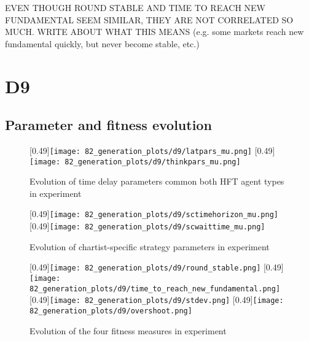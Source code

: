 EVEN THOUGH ROUND STABLE AND TIME TO REACH NEW FUNDAMENTAL SEEM SIMILAR, THEY ARE NOT CORRELATED SO MUCH. WRITE ABOUT WHAT THIS MEANS (e.g. some markets reach new fundamental quickly, but never become stable, etc.)

\section{D9}

\subsection{Parameter and fitness evolution}

\begin{figure}
	\centering
	[0.49\linewidth]{\texttt{[image: 82\_generation\_plots/d9/latpars\_mu.png]}}
	[0.49\linewidth]{\texttt{[image: 82\_generation\_plots/d9/thinkpars\_mu.png]}}
	\caption{Evolution of time delay parameters common both HFT agent types in experiment \dthree}\label{fig:d9_evolution_latpars}
\end{figure}


\begin{figure}
	[0.49\linewidth]{\texttt{[image: 82\_generation\_plots/d9/sctimehorizon\_mu.png]}}
	[0.49\linewidth]{\texttt{[image: 82\_generation\_plots/d9/scwaittime\_mu.png]}}
	\caption{Evolution of chartist-specific strategy parameters in experiment \dnine}\label{fig:d9_evolution_thinkpars}
\end{figure}



\begin{figure}
	\centering
	[0.49\linewidth]{\texttt{[image: 82\_generation\_plots/d9/round\_stable.png]}}
	[0.49\linewidth]{\texttt{[image: 82\_generation\_plots/d9/time\_to\_reach\_new\_fundamental.png]}}
	[0.49\linewidth]{\texttt{[image: 82\_generation\_plots/d9/stdev.png]}}
	[0.49\linewidth]{\texttt{[image: 82\_generation\_plots/d9/overshoot.png]}}
	\caption{Evolution of the four fitness measures in experiment \dnine}\label{fig:d9_evolution_fitness}
\end{figure}

